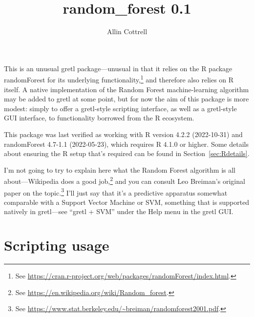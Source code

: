 \documentclass{article}
\begin{document}
\setlength{\parindent}{0pt}
\setlength{\parskip}{1ex}

\title{random\_forest 0.1} \author{Allin Cottrell}
\maketitle

This is an unusual gretl package---unusual in that it relies on the
\textsf{R} package \textsf{randomForest} for its underlying
functionality,\footnote{See
  \url{https://cran.r-project.org/web/packages/randomForest/index.html}.}
and therefore also relies on \textsf{R} itself. A native
implementation of the Random Forest machine-learning algorithm may be
added to gretl at some point, but for now the aim of this package is
more modest: simply to offer a gretl-style scripting interface, as
well as a gretl-style GUI interface, to functionality borrowed from
the \textsf{R} ecosystem.

This package was last verified as working with \textsf{R} version
4.2.2 (2022-10-31) and \textsf{randomForest} 4.7-1.1 (2022-05-23),
which requires \textsf{R} 4.1.0 or higher. Some details about ensuring
the \textsf{R} setup that's required can be found in
Section~\ref{sec:Rdetails}.

I'm not going to try to explain here what the Random Forest algorithm
is all about---Wikipedia does a good job,\footnote{See
  \url{https://en.wikipedia.org/wiki/Random_forest}.} and you can
consult Leo Breiman's original paper on the topic.\footnote{See
  \url{https://www.stat.berkeley.edu/~breiman/randomforest2001.pdf}.}
I'll just say that it's a predictive apparatus somewhat comparable
with a Support Vector Machine or SVM, something that is supported
natively in gretl---see ``gretl + SVM'' under the \textsf{Help} menu
in the gretl GUI.

\section{Scripting usage}
\end{document}
